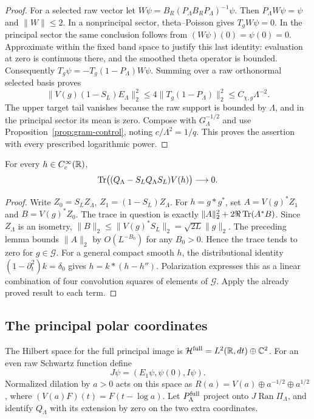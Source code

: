 \begin{proof}
For a selected raw vector let
$W\psi=B_R(P_\Lambda B_RP_\Lambda)^{-1}\psi$.
Then $P_\Lambda W\psi=\psi$ and $\|W\|\leq2$.
In a nonprincipal sector, theta--Poisson gives $T_gW\psi=0$.
In the principal sector the same conclusion follows from
$(W\psi)(0)=\psi(0)=0$. Approximate within the fixed band space
to justify this last identity: evaluation at zero is continuous
there, and the smoothed theta operator is bounded.
Consequently $T_g\psi=-T_g(1-P_\Lambda)W\psi$. Summing over a
raw orthonormal selected basis proves
\[
 \|V(g)(1-S_L)E_\Lambda\|_2^2
       \leq4\|T_g(1-P_\Lambda)\|_2^2
       \leq C_{\chi,g}\Lambda^{-2}.
\]
The upper target tail vanishes because the raw support is bounded
by $\Lambda$, and in the principal sector its mean is zero.
Compose with $G_\Lambda^{-1/2}$ and use
Proposition~\ref{prop:gram-control}, noting $c/\Lambda^2=1/q$.
This proves the assertion with every prescribed logarithmic power.
\end{proof}

\begin{proposition}\label{prop:trace-compression}
For every $h\in C_c^\infty(\mathbb R)$,
\[
 \operatorname{Tr}\bigl((Q_\Lambda-S_LQ_\Lambda S_L)V(h)\bigr)\longrightarrow0.
\]
\end{proposition}
\begin{proof}
Write $Z_0=S_LZ_\Lambda$, $Z_1=(1-S_L)Z_\Lambda$.
For $h=g*g^*$, set $A=V(g)^*Z_1$ and $B=V(g)^*Z_0$.
The trace in question is exactly
$\|A\|_2^2+2\Re\operatorname{Tr}(A^*B)$.
Since $Z_\Lambda$ is an isometry,
$\|B\|_2\leq\|V(g)^*S_L\|_2=\sqrt{2L}\|g\|_2$.
The preceding lemma bounds $\|A\|_2$ by $O(L^{-B_0})$ for any
$B_0>0$. Hence the trace tends to zero for $g\in\mathcal G$.
For a general compact smooth $h$, the distributional identity
$(1-\partial_t^2)k=\delta_0$ gives $h=k*(h-h'')$.
Polarization expresses this as a linear combination of four
convolution squares of elements of $\mathcal G$. Apply the
already proved result to each term.
\end{proof}

\subsection{The principal polar coordinates}
The Hilbert space for the full principal image is
$\mathcal H^{\rm full}=L^2(\mathbb R,dt)\oplus\mathbb C^2$.
For an even raw Schwartz function define
\[
 J\psi=(E_1\psi,\psi(0),I\psi).
\]
Normalized dilation by $a>0$ acts on this space as
$R(a)=V(a)\oplus a^{-1/2}\oplus a^{1/2}$, where
$(V(a)F)(t)=F(t-\log a)$.
Let $P_\Lambda^{\rm full}$ project onto
$J\operatorname{Ran}\Pi_\Lambda$, and identify $Q_\Lambda$
with its extension by zero on the two extra coordinates.

